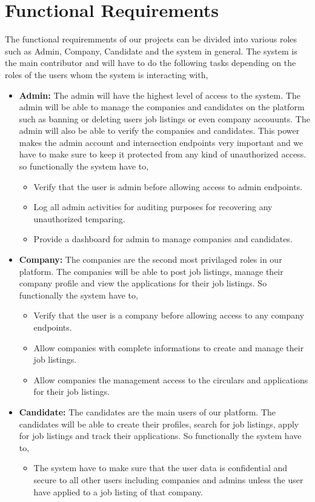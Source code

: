 \documentclass[a4paper, 14pt, openany]{extreport}
\begin{document}
	\section{Functional Requirements}
	The functional requiremments of our projects can be divided into various roles such as Admin, Company, Candidate and the system in general. The system is the main contributor and will have to do the following tasks depending on the roles of the users whom the system is interacting with, 
	\begin{itemize}
		\item \textbf{Admin:} The admin will have the highest level of access to the system. The admin will be able to manage the companies and candidates on the platform such as banning or deleting users job listings or even company accouunts. The admin will also be able to verify the companies and candidates. This power makes the admin account and interaection endpoints very important and we have to make sure to keep it protected from any kind of unauthorized access. so functionally the system have to, 
		\begin{itemize}
			\item Verify that the user is admin before allowing access to admin endpoints.
			\item Log all admin activities for auditing purposes for recovering any unauthorized temparing.
			\item Provide a dashboard for admin to manage companies and candidates.
		\end{itemize}
		\item \textbf{Company:} The companies are the second most privilaged roles in our platform. The companies will be able to post job listings, manage their company profile and view the applications for their job listings. So functionally the system have to,
		\begin{itemize}
			\item Verify that the user is a company before allowing access to any company endpoints.
			\item Allow companies with complete informations to create and manage their job listings. 
			\item Allow companies the management access to the circulars and applications for their job listings.
		\end{itemize}
		\item \textbf{Candidate:} The candidates are the main users of our platform. The candidates will be able to create their profiles, search for job listings, apply for job listings and track their applications. So functionally the system have to,
		\begin{itemize}
			\item The system have to make sure that the user data is confidential and secure to all other users including companies and admins unless the user have applied to a job listing of that company.
		\end{itemize}
	\end{itemize}
\end{document}
